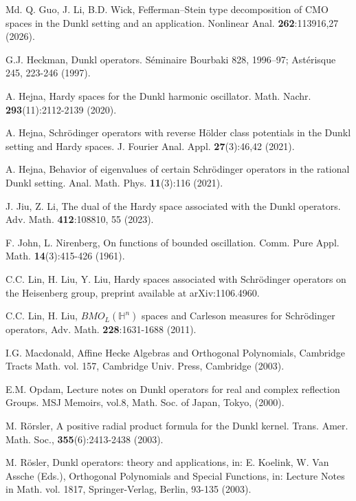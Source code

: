 \documentclass[11pt, reqno]{amsproc}
\theoremstyle{definition}
\theoremstyle{remark}
\numberwithin{equation}{section}
\begin{document}
\begin{thebibliography}{Md.}
Q. Guo, J. Li, B.D. Wick, Fefferman–Stein type decomposition of CMO spaces in the Dunkl setting and an application. Nonlinear Anal. \textbf{262}:113916,27 (2026). 

 G.J. Heckman,  Dunkl operators. Séminaire Bourbaki 828, 1996–97; Astérisque 245, 223-246 (1997).

A. Hejna, Hardy spaces for the {D}unkl harmonic oscillator. Math. Nachr. \textbf{293}(11):2112-2139 (2020).

A. Hejna, Schr\"odinger operators with reverse H\"older class potentials in the Dunkl setting and Hardy spaces. J. Fourier Anal. Appl. \textbf{27}(3):46,42 (2021).

A. Hejna, Behavior of eigenvalues of certain {S}chr\"odinger operators in the rational {D}unkl setting. Anal. Math. Phys. \textbf{11}(3):116 (2021).

J. Jiu, Z. Li, The dual of the Hardy space associated with the Dunkl operators. Adv. Math. \textbf{412}:108810, 55 (2023).


F. John,  L. Nirenberg, On functions of bounded oscillation. Comm. Pure Appl. Math. \textbf{14}(3):415-426 (1961).

C.C. Lin, H. Liu, Y. Liu, Hardy spaces associated with Schr\"odinger operators on the Heisenberg group, preprint available at  arXiv:1106.4960. 

 C.C. Lin, H. Liu, $BMO_L(\mathbb{H}^n) $ spaces and Carleson measures for Schr\"odinger operators, Adv. Math. \textbf{228}:1631-1688 (2011).

I.G. Macdonald, Affine Hecke Algebras and Orthogonal Polynomials, Cambridge Tracts Math. vol. 157, Cambridge Univ. Press, Cambridge (2003).

E.M. Opdam, Lecture notes on Dunkl operators for real and complex reflection Groups. MSJ Memoirs, vol.8,  Math. Soc. of Japan, Tokyo, (2000).

M. R\"orsler,  A positive radial product formula for the Dunkl kernel. Trans. Amer. Math. Soc., \textbf{355}(6):2413-2438 (2003).

 M. R\"osler, Dunkl operators: theory and applications, in: E. Koelink, W. Van Assche (Eds.), Orthogonal Polynomials and Special Functions, in: Lecture Notes in Math. vol. 1817, Springer-Verlag, Berlin, 93-135 (2003).


\end{thebibliography}
\end{document}

